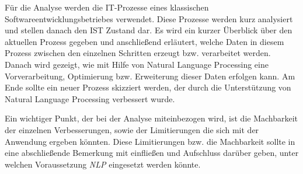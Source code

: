 Für die Analyse werden die IT-Prozesse eines klassischen Softwareentwicklungsbetriebes verwendet. Diese Prozesse werden kurz analysiert und stellen danach den IST Zustand dar. Es wird ein kurzer Überblick über den aktuellen Prozess gegeben und anschließend erläutert, welche Daten in diesem Prozess zwischen den einzelnen Schritten erzeugt bzw. verarbeitet werden. Danach wird gezeigt, wie mit Hilfe von Natural Language Processing eine Vorverarbeitung, Optimierung bzw. Erweiterung dieser Daten erfolgen kann. Am Ende sollte ein neuer Prozess skizziert werden, der durch die Unterstützung von Natural Language Processing verbessert wurde. 

Ein wichtiger Punkt, der bei der Analyse miteinbezogen wird, ist die Machbarkeit der einzelnen Verbesserungen, sowie der Limitierungen die sich mit der Anwendung ergeben könnten. Diese Limitierungen bzw. die Machbarkeit sollte in eine abschließende Bemerkung mit einfließen und Aufschluss darüber geben, unter welchen Voraussetzung \textit{NLP} eingesetzt werden könnte.
